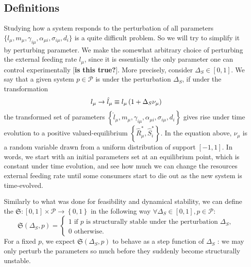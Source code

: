 \documentclass[12pt, titlepage]{report}
\begin{document}
\subsection{Definitions}
Studying how a system responds to the perturbation of all parameters $\{l_\mu, m_\mu, \gamma_{i\mu}, \alpha_{\mu i}, \sigma_{i\mu},d_i\}$ is a quite difficult problem. So we will try to simplify it by perturbing  parameter. We make the somewhat arbitrary choice of perturbing the external feeding rate $l_\mu$, since it is essentially the only parameter one can control experimentally [\textbf{is this true?}]. More precisely, consider $\Delta_S \in [0,1]$. We say that a given system $p \in \mathcal{P}$ is  under the perturbation $\Delta_S$, if under the transformation
\begin{equation}
l_\mu \rightarrow \hat{l}_\mu \equiv l_\mu\left( 1+\Delta_S \nu_\mu \right) \label{eq : ss methods l perturbation}
\end{equation}
the transformed set of parameters $\left\{ \hat{l}_\mu, m_\mu, \gamma_{i\mu}, \alpha_{\mu i}, \sigma_{i\mu},d_i \right\}$ gives rise under time evolution to a positive valued-equilibrium $\left\{\hat{R}^*_\mu, \hat{S}^*_i\right\}$. In the equation above, $\nu_\mu$ is a random variable drawn from a uniform distribution of support $[-1, 1]$. In words, we start with an initial parameters set at an equilibrium point, which is constant under time evolution, and see how much we can change the resources external feeding rate until some consumers start to die out as the new system is time-evolved.

Similarly to what was done for feasibility and dynamical stability, we can define the  $\mathfrak{S} : [0,1] \times \mathcal{P} \rightarrow \left\{0,1\right\}$ in the following way $\forall \Delta_S \in [0,1], p \in \mathcal{P}$:
\begin{equation}
\mathfrak{S}(\Delta_S, p)=
\begin{cases}
1 \text{ if }p \text{ is structurally stable under the perturbation }\Delta_S, \\
0 \text{ otherwise.}
\end{cases}
\end{equation}
For a fixed $p$, we expect $\mathfrak{S}(\Delta_S, p)$ to behave as a step function of $\Delta_S$ : we may only perturb the parameters so much before they suddenly become structurally unstable.
\end{document}
